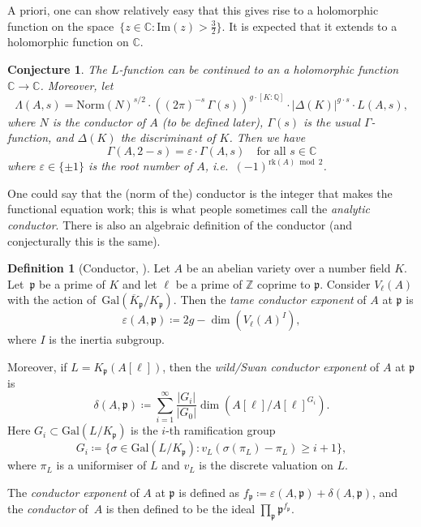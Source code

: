 \documentclass[12pt]{article}
\newtheorem{conjecture}[theorem]{Conjecture}
\theoremstyle{definition}
\newtheorem{definition}[theorem]{Definition}
\numberwithin{equation}{subsection}
\newcommand{\C}{\ensuremath{\mathbb{C}}}
\newcommand{\Q}{\ensuremath{\mathbb{Q}}}
\newcommand{\Z}{\ensuremath{\mathbb{Z}}}
\begin{document}
A priori, one can show relatively easy that this gives rise to a holomorphic function on the space~$\{z \in \C : \mathrm{Im}(z) > \tfrac32\}$.
It is expected that it extends to a holomorphic function on $\C$.

\begin{conjecture}
The $L$-function can be continued to an a holomorphic function $\C \to \C$. Moreover, let
$$\Lambda(A,s) = \mathrm{Norm}(N)^{s/2} \cdot \left( (2\pi)^{-s} \, \Gamma(s) \right)^{g \cdot [K:\Q]} \cdot |\Delta(K)|^{g \cdot s} \cdot L(A,s),$$
where $N$ is the conductor of $A$ (to be defined later), $\Gamma(s)$ is the usual $\Gamma$-function, and $\Delta(K)$ the discriminant of $K$.
Then we have $$\Gamma(A, 2-s) = \varepsilon \cdot \Gamma(A,s) \quad \textrm{for all } s \in \C$$
where $\varepsilon \in \{\pm 1\}$ is the root number of $A$, i.e.\ $(-1)^{\mathrm{rk}(A) \bmod 2}$.
\end{conjecture}

One could say that the (norm of the) conductor is the integer that makes the functional equation work; this is what people sometimes call the {\em analytic conductor}.
There is also an algebraic definition of the conductor (and conjecturally this is the same).

\begin{definition}[Conductor, \textrm{\cite{BrumerKramer}}]
Let $A$ be an abelian variety over a number field $K$.
Let~$\mathfrak{p}$ be a prime of $K$ and let $\ell$ be a prime of $\Z$ coprime to $\mathfrak{p}$.
Consider $V_{\ell}(A)$ with the action of~$\mathrm{Gal}(\overline{K}_\mathfrak{p} / K_\mathfrak{p})$.
Then the {\em tame conductor exponent} of $A$ at $\mathfrak{p}$ is
$$\varepsilon(A,\mathfrak{p}) \coloneqq 2g - \dim\!\left(V_\ell(A)^I\right),$$
where $I$ is the inertia subgroup.

Moreover, if $L = K_\mathfrak{p}(A[\ell])$, then the {\em wild/Swan conductor exponent} of $A$ at $\mathfrak{p}$ is
$$\delta(A,\mathfrak{p}) \coloneqq \sum_{i=1}^\infty \frac{|G_i|}{|G_0|} \dim\!\left( A[\ell] / A[\ell]^{G_i} \right).$$
Here $G_i \subset \mathrm{Gal}(L / K_\mathfrak{p})$ is the $i$-th ramification group $$G_i \coloneqq \{ \sigma \in \mathrm{Gal}(L / K_\mathfrak{p}) : v_L( \sigma(\pi_L) - \pi_L) \geq i+1\},$$
where $\pi_L$ is a uniformiser of $L$ and $v_L$ is the discrete valuation on $L$.

The {\em conductor exponent} of $A$ at $\mathfrak{p}$ is defined as $f_\mathfrak{p} \coloneqq \varepsilon(A,\mathfrak{p}) + \delta(A,\mathfrak{p})$, and the {\em conductor} of~$A$ is then defined to be the ideal $\prod_\mathfrak{p} \mathfrak{p}^{f_\mathfrak{p}}$.
\end{definition}
\end{document}
